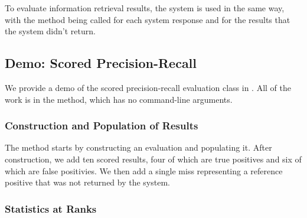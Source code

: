 To evaluate information retrieval results, the system is used in the
same way, with the method  being called for each
system response and  for the results that the
system didn't return.


\subsection{Demo: Scored Precision-Recall}

We provide a demo of the scored precision-recall evaluation class in
.  All of the work is in the
 method, which has no command-line arguments.

\subsubsection{Construction and Population of Results}

The  method starts by constructing an evaluation and
populating it.
%
%
After construction, we add ten scored results, four of which are true
positives and six of which are false positivies.  We then add a
single miss representing a reference positive that was not returned by
the system.

\subsubsection{Statistics at Ranks}

